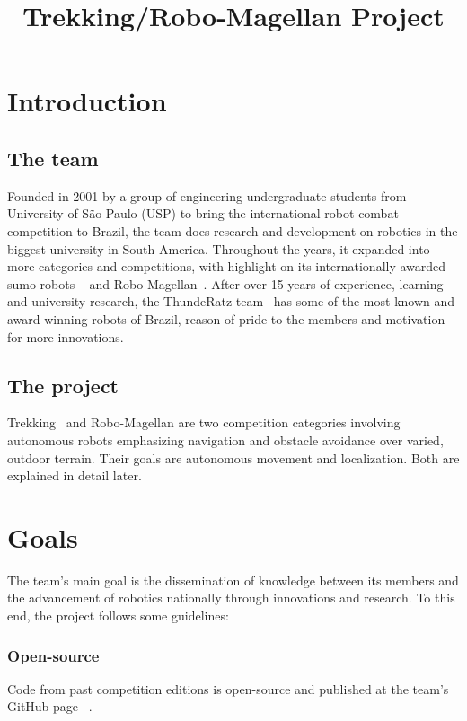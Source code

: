 \documentclass[conference]{IEEEtran}
\begin{document}
\title{Trekking/Robo-Magellan Project}

\author{
}

\maketitle

\section{Introduction}
\subsection{The team}
Founded in 2001 by a group of engineering undergraduate students from University
of São Paulo (USP) to bring the international robot combat competition to Brazil,
the team does research and development on robotics in the biggest university in
South America. Throughout the years, it expanded into more categories and
competitions, with highlight on its internationally awarded sumo robots
~\cite{All Japan Robot Sumo} and Robo-Magellan~\cite{SRS}. After over 15 years
of experience, learning and university research, the ThundeRatz team~\cite{ThundeRatz}
has some of the most known and award-winning robots of Brazil, reason of pride to
the members and motivation for more innovations.

\subsection{The project}
Trekking~\cite{Trekking} and Robo-Magellan are two competition categories
involving autonomous robots emphasizing navigation and obstacle avoidance over
varied, outdoor terrain. Their goals are autonomous movement and localization.
Both are explained in detail later.

\section{Goals}
\setcounter{section}{0}
The team's main goal is the dissemination of knowledge between its members and
the advancement of robotics nationally through innovations and research. To this
end, the project follows some guidelines:
\subsubsection{Open-source}
Code from past competition editions is open-source and published at the team's
GitHub page ~\cite{Git-TR}.
\end{document}
